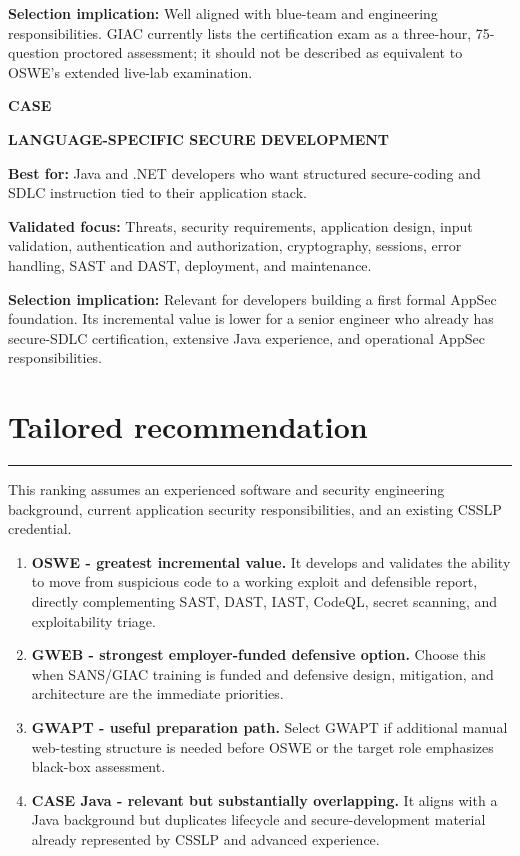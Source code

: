 \documentclass[11pt]{article}
\newcommand{\sectionrule}{\vspace{-2pt}\color{Rule}\rule{\linewidth}{0.6pt}\color{black}\vspace{2pt}}
\newcommand{\credential}[2]{%
  \Needspace{8\baselineskip}%
  \vspace{2pt}
  {\large\bfseries\color{Navy}#1}\hfill
  \colorbox{Sky}{\strut\small\bfseries\color{Blue}#2}
  \par\vspace{2pt}
}
\begin{document}
\textbf{Selection implication:} Well aligned with blue-team and engineering
responsibilities. GIAC currently lists the certification exam as a three-hour,
75-question proctored assessment; it should not be described as equivalent to
OSWE's extended live-lab examination.

\credential{CASE}{LANGUAGE-SPECIFIC SECURE DEVELOPMENT}
\textbf{Best for:} Java and .NET developers who want structured secure-coding and
SDLC instruction tied to their application stack.

\textbf{Validated focus:} Threats, security requirements, application design,
input validation, authentication and authorization, cryptography, sessions, error
handling, SAST and DAST, deployment, and maintenance.

\textbf{Selection implication:} Relevant for developers building a first formal
AppSec foundation. Its incremental value is lower for a senior engineer who
already has secure-SDLC certification, extensive Java experience, and operational
AppSec responsibilities.

\section*{Tailored recommendation}
\sectionrule

This ranking assumes an experienced software and security engineering background,
current application security responsibilities, and an existing CSSLP credential.

\begin{enumerate}[label=\textbf{\arabic*.}]
  \item \textbf{OSWE - greatest incremental value.} It develops and validates the
  ability to move from suspicious code to a working exploit and defensible report,
  directly complementing SAST, DAST, IAST, CodeQL, secret scanning, and
  exploitability triage.

  \item \textbf{GWEB - strongest employer-funded defensive option.} Choose this
  when SANS/GIAC training is funded and defensive design, mitigation, and
  architecture are the immediate priorities.

  \item \textbf{GWAPT - useful preparation path.} Select GWAPT if additional
  manual web-testing structure is needed before OSWE or the target role emphasizes
  black-box assessment.

  \item \textbf{CASE Java - relevant but substantially overlapping.} It aligns
  with a Java background but duplicates lifecycle and secure-development material
  already represented by CSSLP and advanced experience.
\end{enumerate}
\end{document}
